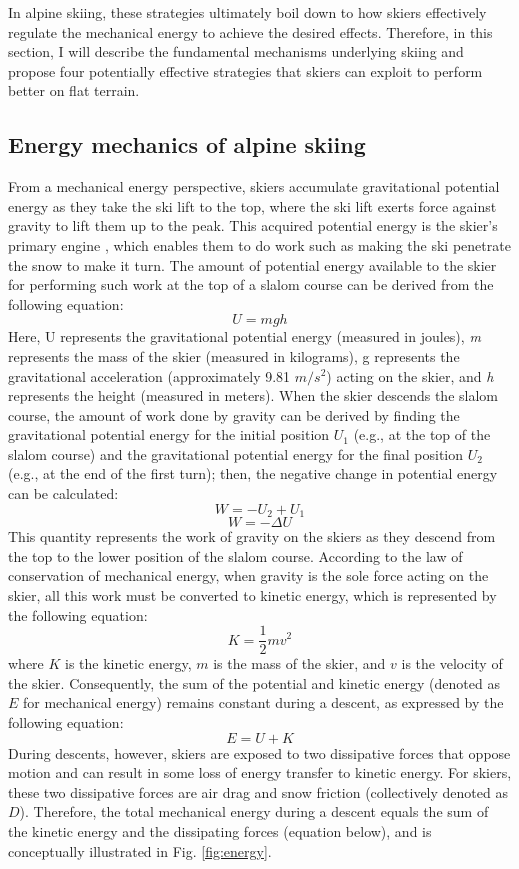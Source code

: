 In alpine skiing, these strategies ultimately boil down to how skiers effectively regulate the mechanical energy to achieve the desired effects. Therefore, in this section, I will describe the fundamental mechanisms underlying skiing and propose four potentially effective strategies that skiers can exploit to perform better on flat terrain.

\subsection{Energy mechanics of alpine skiing}
From a mechanical energy perspective, skiers accumulate gravitational potential energy as they take the ski lift to the top, where the ski lift exerts force against gravity to lift them up to the peak. This acquired potential energy is the skier's primary engine \cite{supej_differential_2008}, which enables them to do work such as making the ski penetrate the snow to make it turn. The amount of potential energy available to the skier for performing such work at the top of a slalom course can be derived from the following equation:
\[U=mgh\]
Here, U represents the gravitational potential energy (measured in joules), \textit{m} represents the mass of the skier (measured in kilograms), g represents the gravitational acceleration (approximately 9.81 $m/s^2$) acting on the skier, and \textit{h} represents the height (measured in meters). When the skier descends the slalom course, the amount of work done by gravity can be derived by finding the gravitational potential energy for the initial position $U_1$ (e.g., at the top of the slalom course) and the gravitational potential energy for the final position $U_2$ (e.g., at the end of the first turn); then, the negative change in potential energy can be calculated: 
\[W=-U_2 + U_1\]
\[W= -\Delta U \]
This quantity represents the work of gravity on the skiers as they descend from the top to the lower position of the slalom course. According to the law of conservation of mechanical energy, when gravity is the sole force acting on the skier, all this work must be converted to kinetic energy, which is represented by the following equation:
\[ K = \frac{1}{2} m v^2 \]
where $K$ is the kinetic energy, $m$ is the mass of the skier, and $v$ is the velocity of the skier. Consequently, the sum of the potential and kinetic energy  (denoted as $E$ for mechanical energy) remains constant during a descent, as expressed by the following equation:
\[ E = U + K \]
During descents, however, skiers are exposed to two dissipative forces that oppose motion and can result in some loss of energy transfer to kinetic energy. For skiers, these two dissipative forces are air drag and snow friction (collectively denoted as $D$). Therefore, the total mechanical energy during a descent equals the sum of the kinetic energy and the dissipating forces (equation below), and is conceptually illustrated in Fig. \ref{fig:energy}.
